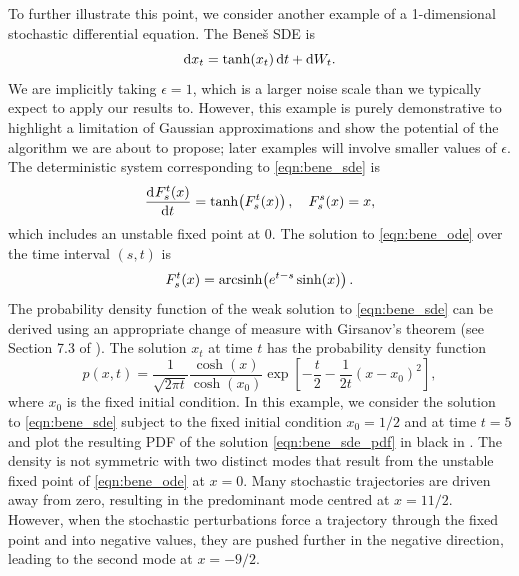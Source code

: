 To further illustrate this point, we consider another example of a 1-dimensional stochastic differential equation.
The Bene\v{s} SDE \citep{SarkkaSolin_2019_AppliedStochasticDifferential} is
\begin{equation}
	\dif x_t = \tanh\!\left(x_t\right)\dif t + \dif W_t.
	\label{eqn:bene_sde}
\end{equation}
We are implicitly taking \(\epsilon = 1\), which is a larger noise scale than we typically expect to apply our results to.
However, this example is purely demonstrative to highlight a limitation of Gaussian approximations and show the potential of the algorithm we are about to propose; later examples will involve smaller values of \(\epsilon\).
The deterministic system corresponding to \cref{eqn:bene_sde} is
\begin{equation}
	\dod{F_s^t\!\left(x\right)}{t} = \tanh\!\left(F_s^t\!\left(x\right)\right), \quad F_s^s\!\left(x\right) = x,
	\label{eqn:bene_ode}
\end{equation}
which includes an unstable fixed point at \(0\).
The solution to \cref{eqn:bene_ode} over the time interval \((s,t)\) is
\begin{equation}
	F_s^t\!\left(x\right) = \operatorname{arcsinh}\!\left(e^{t-s}\sinh\!\left(x\right)\right).
	\label{eqn:bene_ode_sol}
\end{equation}
The probability density function of the weak solution to \cref{eqn:bene_sde} can be derived using an appropriate change of measure with Girsanov's theorem (see Section 7.3 of \citet{SarkkaSolin_2019_AppliedStochasticDifferential}).
The solution \(x_t\) at time \(t\) has the probability density function
\begin{equation}\label{eqn:bene_sde_pdf}
	p(x,t) = \frac{1}{\sqrt{2\pi t}}\frac{\cosh\!\left(x\right)}{\cosh\!\left(x_0\right)}\exp\left[-\frac{t}{2} - \frac{1}{2t}\left(x - x_0\right)^2\right],
\end{equation}
where \(x_0\) is the fixed initial condition.
In this example, we consider the solution to \cref{eqn:bene_sde} subject to the fixed initial condition \(x_0 = 1/2\) and at time \(t = 5\) and plot the resulting PDF of the solution \cref{eqn:bene_sde_pdf} in black in .
The density is not symmetric with two distinct modes that result from the unstable fixed point of \cref{eqn:bene_ode} at \(x = 0\).
Many stochastic trajectories are driven away from zero, resulting in the predominant mode centred at \(x = 11/2\).
However, when the stochastic perturbations force a trajectory through the fixed point and into negative values, they are pushed further in the negative direction, leading to the second mode at \(x = -9/2\).
